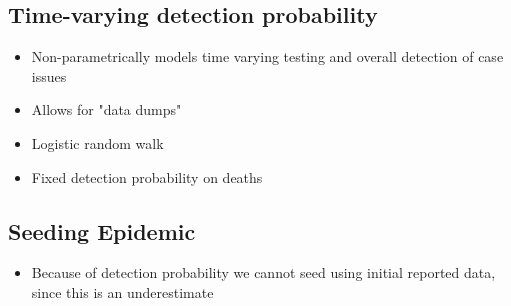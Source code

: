 \documentclass[11pt]{amsart}
\begin{document}
 \subsection{Time-varying detection probability}
  \begin{itemize}
 \item Non-parametrically models time varying testing and overall detection of case issues
 \item Allows for "data dumps"
 \item Logistic random walk 
 \item Fixed detection probability on deaths

  \end{itemize}

\subsection{Seeding Epidemic}

 \begin{itemize}
 \item Because of detection probability we cannot seed using initial reported data, since this is an underestimate
  \end{itemize}
\end{document}
